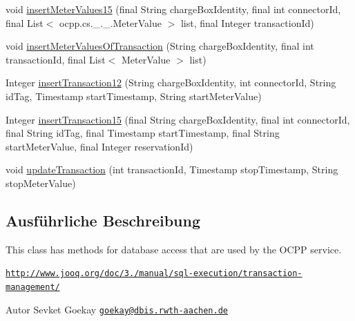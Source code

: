 \begin{DoxyCompactItemize}
\item 
void \hyperlink{classde_1_1rwth_1_1idsg_1_1steve_1_1repository_1_1_ocpp_server_repository_impl_a89d4a78cded5d723ce2038b7b749d0c0}{insert\-Meter\-Values15} (final String charge\-Box\-Identity, final int connector\-Id, final List$<$ ocpp.\-cs.\-\_.\-\_.\-Meter\-Value $>$ list, final Integer transaction\-Id)
\item 
void \hyperlink{classde_1_1rwth_1_1idsg_1_1steve_1_1repository_1_1_ocpp_server_repository_impl_a50e39b6c6e1232438bbd72dbccc16506}{insert\-Meter\-Values\-Of\-Transaction} (String charge\-Box\-Identity, final int transaction\-Id, final List$<$ Meter\-Value $>$ list)
\item 
Integer \hyperlink{classde_1_1rwth_1_1idsg_1_1steve_1_1repository_1_1_ocpp_server_repository_impl_a6bfdaf50f0704ae9f58da71eef56c70e}{insert\-Transaction12} (String charge\-Box\-Identity, int connector\-Id, String id\-Tag, Timestamp start\-Timestamp, String start\-Meter\-Value)
\item 
Integer \hyperlink{classde_1_1rwth_1_1idsg_1_1steve_1_1repository_1_1_ocpp_server_repository_impl_aff6979d9ce78c176a14dd08fc83e0c42}{insert\-Transaction15} (final String charge\-Box\-Identity, final int connector\-Id, final String id\-Tag, final Timestamp start\-Timestamp, final String start\-Meter\-Value, final Integer reservation\-Id)
\item 
void \hyperlink{classde_1_1rwth_1_1idsg_1_1steve_1_1repository_1_1_ocpp_server_repository_impl_a4433f551124442bf1413599cb836503e}{update\-Transaction} (int transaction\-Id, Timestamp stop\-Timestamp, String stop\-Meter\-Value)
\end{DoxyCompactItemize}


\subsection{Ausführliche Beschreibung}
This class has methods for database access that are used by the O\-C\-P\-P service.

\href{http://www.jooq.org/doc/3.4/manual/sql-execution/transaction-management/}{\tt http\-://www.\-jooq.\-org/doc/3./manual/sql-\/execution/transaction-\/management/}

\begin{DoxyAuthor}{Autor}
Sevket Goekay \href{mailto:goekay@dbis.rwth-aachen.de}{\tt goekay@dbis.\-rwth-\/aachen.\-de} 
\end{DoxyAuthor}


